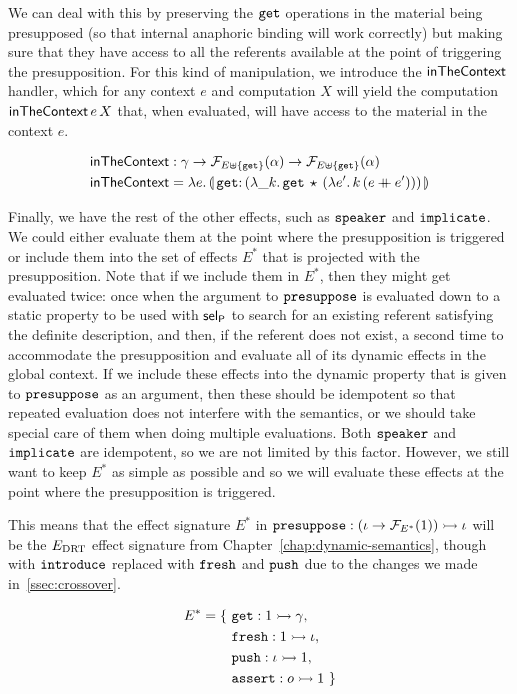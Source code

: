 We can deal with this by preserving the $\mathtt{get}$ operations in the
material being presupposed (so that internal anaphoric binding will work
correctly) but making sure that they have access to all the referents
available at the point of triggering the presupposition. For this kind of
manipulation, we introduce the $\textsf{inTheContext}$ handler, which for any
context $e$ and computation $X$ will yield the computation
$\textsf{inTheContext}\,e\,X$ that, when evaluated, will have access to the
material in the context $e$.

\begin{align*}
  \inTheContext &: \gamma \to \FF_{E \uplus \{\op{get}\}}(\alpha)
                          \to \FF_{E \uplus \{\op{get}\}}(\alpha) \\
  \inTheContext &= \lam{e}{\banana{\onto{\op{get}}{(\lam{\_ k}{\app{\op{get}}{\star}{(\lam{e'}{\ap{k}{(e \cat e')}})}})}}}
\end{align*}

Finally, we have the rest of the other effects, such as $\mathtt{speaker}$ and
$\mathtt{implicate}$. We could either evaluate them at the point where the
presupposition is triggered or include them into the set of effects $E^*$
that is projected with the presupposition. Note that if we include them in
$E^*$, then they might get evaluated twice: once when the argument to
$\mathtt{presuppose}$ is evaluated down to a static property to be used with
$\textsf{sel}_{\textsf{P}}$ to search for an existing referent satisfying the definite
description, and then, if the referent does not exist, a second time to
accommodate the presupposition and evaluate all of its dynamic effects in
the global context. If we include these effects into the dynamic property
that is given to $\mathtt{presuppose}$ as an argument, then these should be
idempotent so that repeated evaluation does not interfere with the
semantics, or we should take special care of them when doing multiple
evaluations. Both $\mathtt{speaker}$ and $\mathtt{implicate}$ are idempotent, so we
are not limited by this factor. However, we still want to keep $E^*$ as
simple as possible and so we will evaluate these effects at the point where
the presupposition is triggered.

This means that the effect signature $E^*$ in
$\mathtt{presuppose} : (\iota \to \mathcal{F}_{E^*}(1)) \rightarrowtail \iota$ will be the $E_{\mathrm{DRT}}$
effect signature from Chapter~\ref{chap:dynamic-semantics}, though with
$\mathtt{introduce}$ replaced with $\mathtt{fresh}$ and $\mathtt{push}$ due to the
changes we made in~\ref{ssec:crossover}.

\begin{align*}
  E^* = \{\ &\mathtt{get} : 1 \rightarrowtail \gamma, \\
            &\mathtt{fresh} : 1 \rightarrowtail \iota, \\
            &\mathtt{push} : \iota \rightarrowtail 1, \\
            &\mathtt{assert} : o \rightarrowtail 1\ \}
\end{align*}

